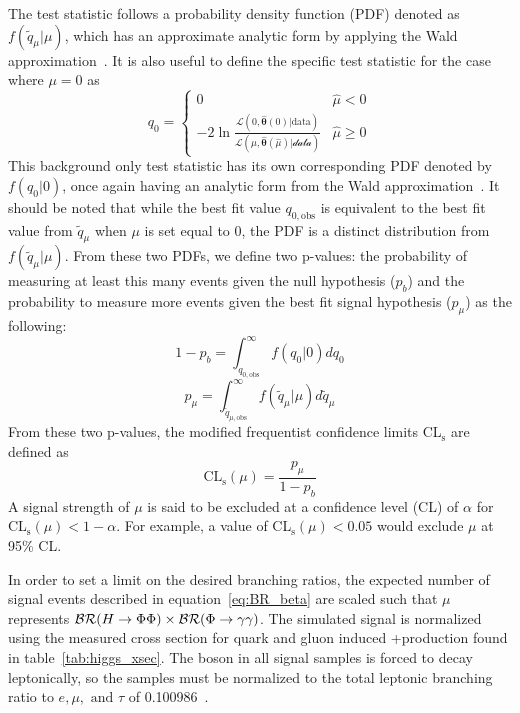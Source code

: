 The test statistic follows a probability density function (PDF) denoted as $f(\tilde{q}_\mu|\mu)$, which has an approximate analytic form by applying the Wald approximation~\cite{Cowan_2011}. It is also useful to define the specific test statistic for the case where $\mu=0$ as
\begin{equation}
	\label{eq:test_q0}
	q_0=\begin{cases}
		0 & \hat{\mu}<0\\
		-2\ln{\frac{\mathcal{L}(0, \hat{\boldsymbol{\theta}}(0)|\text{data})}{\mathcal{L(\hat{\mu}, \hat{\boldsymbol{\theta}}(\hat{\mu})|\text{data})}}} & \hat{\mu}\geq0
	\end{cases}
\end{equation}
This background only test statistic has its own corresponding PDF denoted by $f(q_0|0)$, once again having an analytic form from the Wald approximation~\cite{Cowan_2011}. It should be noted that while the best fit value $q_{0,\text{obs}}$ is equivalent to the best fit value from $\tilde{q}_\mu$ when $\mu$ is set equal to 0, the PDF is a distinct distribution from $f(\tilde{q}_\mu|\mu)$. From these two PDFs, we define two p-values: the probability of measuring at least this many events given the null hypothesis ($p_b$) and the probability to measure more events given the best fit signal hypothesis ($p_\mu$) as the following: 
\begin{equation}
	\label{eq:pb}
	1-p_b=\int_{q_{0,\text{obs}}}^{\infty}f(q_0|0)dq_0
\end{equation}
\begin{equation}
	\label{eq:p_upper}
	p_\mu=\int_{\tilde{q}_{\mu,\text{obs}}}^{\infty}f(\tilde{q}_\mu|\mu)d\tilde{q}_\mu
\end{equation}
From these two p-values, the modified frequentist confidence limits CL$_\mathrm{s}$ are defined as
\begin{equation}
	\label{eq:cls}
	\text{CL}_\mathrm{s}(\mu)=\frac{p_\mu}{1-p_b}
\end{equation} 
A signal strength of $\mu$ is said to be excluded at a confidence level (CL) of $\alpha$ for CL$_\mathrm{s}(\mu)<1-\alpha$. For example, a value of CL$_\mathrm{s}(\mu)<0.05$ would exclude $\mu$ at 95\% CL.

In order to set a limit on the desired branching ratios, the expected number of signal events described in equation~\ref{eq:BR_beta} are scaled such that $\mu$ represents $\mathcal{BR}(H\to\Phi\Phi)\times\mathcal{BR}(\Phi\to\gamma\gamma)$. The simulated signal is normalized using the measured cross section for quark and gluon induced \VZ+\VH production found in table~\ref{tab:higgs_xsec}. The \VZ boson in all signal samples is forced to decay leptonically, so the samples must be normalized to the total leptonic branching ratio to $e, \mu,\text{ and }\tau$ of 0.100986~\cite{Workman:2022ynf}.

